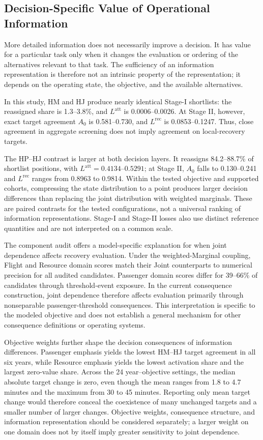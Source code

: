 \subsection{Decision-Specific Value of Operational Information}
\label{subsec:decision_specific_information_value}

More detailed information does not necessarily improve a decision. It has value for a particular task only when it changes the evaluation or ordering of the alternatives relevant to that task. The sufficiency of an information representation is therefore not an intrinsic property of the representation; it depends on the operating state, the objective, and the available alternatives.

In this study, HM and HJ produce nearly identical Stage-I shortlists: the reassigned share is 1.3--3.8\%, and $L^{\mathrm{att}}$ is 0.0006--0.0026. At Stage II, however, exact target agreement $A_0$ is 0.581--0.730, and $L^{\mathrm{rec}}$ is 0.0853--0.1247. Thus, close agreement in aggregate screening does not imply agreement on local-recovery targets.

The HP--HJ contrast is larger at both decision layers. It reassigns 84.2--88.7\% of shortlist positions, with $L^{\mathrm{att}}=0.4134$--$0.5291$; at Stage II, $A_0$ falls to 0.130--0.241 and $L^{\mathrm{rec}}$ ranges from 0.8963 to 0.9814. Within the tested objective and supported cohorts, compressing the state distribution to a point produces larger decision differences than replacing the joint distribution with weighted marginals. These are paired contrasts for the tested configurations, not a universal ranking of information representations. Stage-I and Stage-II losses also use distinct reference quantities and are not interpreted on a common scale.

The component audit offers a model-specific explanation for when joint dependence affects recovery evaluation. Under the weighted-Marginal coupling, Flight and Resource domain scores match their Joint counterparts to numerical precision for all audited candidates. Passenger domain scores differ for 39--66\% of candidates through threshold-event exposure. In the current consequence construction, joint dependence therefore affects evaluation primarily through nonseparable passenger-threshold consequences. This interpretation is specific to the modeled objective and does not establish a general mechanism for other consequence definitions or operating systems.

Objective weights further shape the decision consequences of information differences. Passenger emphasis yields the lowest HM--HJ target agreement in all six years, while Resource emphasis yields the lowest activation share and the largest zero-value share. Across the 24 year--objective settings, the median absolute target change is zero, even though the mean ranges from 1.8 to 4.7 minutes and the maximum from 30 to 45 minutes. Reporting only mean target change would therefore conceal the coexistence of many unchanged targets and a smaller number of larger changes. Objective weights, consequence structure, and information representation should be considered separately; a larger weight on one domain does not by itself imply greater sensitivity to joint dependence.

